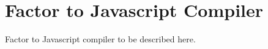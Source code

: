 \chapter{Factor to Javascript Compiler}\label{fjsc}

Factor to Javascript compiler to be described here.
